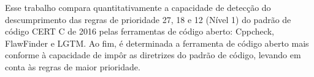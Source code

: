 Esse trabalho compara quantitativamente a capacidade de detecção do descumprimento das regras de prioridade 27, 18 e 12 (Nível 1) do padrão de código CERT C de 2016 pelas ferramentas de código aberto: Cppcheck, FlawFinder e LGTM. Ao fim, é determinada a ferramenta de código aberto mais conforme à capacidade de impôr as diretrizes do padrão de código, levando em conta às regras de maior prioridade.
